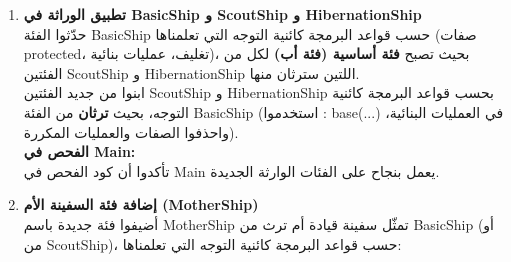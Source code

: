 \documentclass[14pt]{extarticle}
\begin{document}
\begin{enumerate}[resume, label=\textbf{تمرين \arabic*:}, wide=0pt, leftmargin=*, itemsep=2.2em]

    \item \textbf{تطبيق الوراثة في \textenglish{BasicShip} و \textenglish{ScoutShip} و \textenglish{HibernationShip}} \\
    حدّثوا الفئة \textenglish{BasicShip} حسب قواعد البرمجة كائنية التوجه التي تعلمناها (صفات \textenglish{protected}، تغليف، عمليات بنائية)، بحيث تصبح \textbf{فئة أساسية (فئة أب)} لكل من الفئتين \textenglish{ScoutShip} و \textenglish{HibernationShip} اللتين سترثان منها. \\
    ابنوا من جديد الفئتين \textenglish{ScoutShip} و \textenglish{HibernationShip} بحسب قواعد البرمجة كائنية التوجه، بحيث \textbf{ترثان} من الفئة \textenglish{BasicShip} (استخدموا \textenglish{: base(...)} في العمليات البنائية، واحذفوا الصفات والعمليات المكررة). \\
    \textbf{الفحص في \textenglish{Main}:} \\
    تأكدوا أن كود الفحص في \textenglish{Main} يعمل بنجاح على الفئات الوارثة الجديدة.

    \item \textbf{إضافة فئة السفينة الأم (\textenglish{MotherShip})} \\
    أضيفوا فئة جديدة باسم \textenglish{MotherShip} تمثّل سفينة قيادة أم ترث من \textenglish{BasicShip} (أو من \textenglish{ScoutShip})، حسب قواعد البرمجة كائنية التوجه التي تعلمناها:


\end{enumerate}
\end{document}
